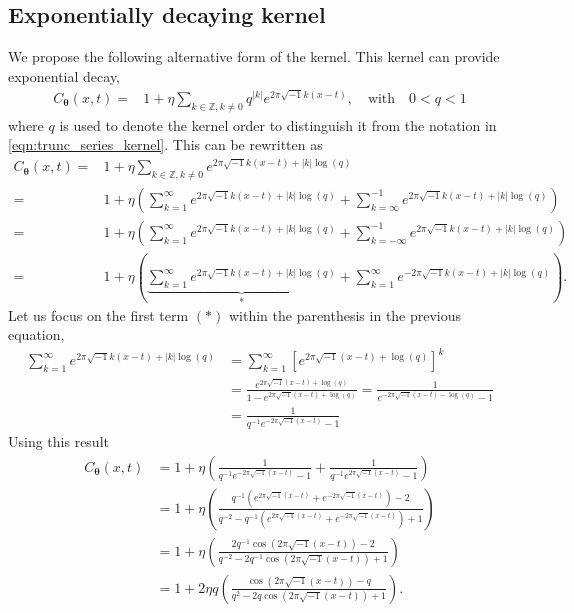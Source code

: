 \documentclass{svjour3}                     %
\newcommand{\bm}[1]{\boldsymbol{#1}}
\newcommand{\vtheta}{{\bm{\theta}}}
\def\abs#1{\ensuremath{\left \lvert #1 \right \rvert}}
\begin{document}
\subsection{Exponentially decaying kernel}
\label{sec:exp_decay_kernel}
We propose the following alternative form of the kernel. This kernel can provide exponential decay,
\begin{align*}
C_\vtheta(x, t) = & 1 + \eta \sum_{k \in \mathbb{Z}, k \neq 0 } q^{\abs{k}}  
e^{ 2 \pi\sqrt{-1} k (x-t)}, \quad \text{with} \quad 0 < q < 1
\end{align*}
where $q$ is used to denote the kernel order to distinguish it from the notation in \eqref{eqn:trunc_series_kernel}. This can be rewritten as
\begin{align*}
C_\vtheta(x, t) = & 1 + \eta \sum_{k \in \mathbb{Z}, k \neq 0 } 
e^{ 2 \pi\sqrt{-1} k (x-t) + \abs{k} \log(q)}
\\
=& 1 + \eta 
\left(
\sum_{k=1}^\infty e^{ 2 \pi\sqrt{-1} k (x-t) + \abs{k} \log(q)} 
+
\sum_{k=\infty}^{-1} e^{ 2 \pi\sqrt{-1} k (x-t) + \abs{k} \log(q)}
\right)
\\
=& 1 + \eta 
\left(
\sum_{k=1}^\infty e^{ 2 \pi\sqrt{-1} k (x-t) + \abs{k} \log(q)} 
+
\sum_{k=-\infty}^{-1} e^{ 2 \pi\sqrt{-1} k (x-t) + \abs{k} \log(q)}
\right)
\\
=& 1 + \eta 
\left(
\underbrace{
	\sum_{k=1}^\infty e^{ 2 \pi\sqrt{-1} k (x-t) + \abs{k} \log(q)} }_{*}
+
\sum_{k=1}^{\infty} e^{ -2 \pi\sqrt{-1} k (x-t) + \abs{k} \log(q)}
\right).
\end{align*}
Let us focus on the first term $(*)$ within the parenthesis in the previous equation,
\begin{align*}
\sum_{k=1}^\infty e^{ 2 \pi\sqrt{-1} k (x-t) + \abs{k} \log(q)} & =
\sum_{k=1}^\infty \left[e^{ 2 \pi\sqrt{-1} (x-t) +  \log(q)} \right]^k
\\
& = \frac{e^{ 2 \pi\sqrt{-1} (x-t) +  \log(q)}}{1- e^{ 2 \pi\sqrt{-1} (x-t) +  \log(q)}}
= \frac{1}{ e^{- 2 \pi\sqrt{-1} (x-t) -  \log(q)} -1 }
\\
& =\frac{1}{ q^{-1} e^{- 2 \pi\sqrt{-1} (x-t)} -1 }
\end{align*}
Using this result
\begin{align*}
C_\vtheta(x, t) &= 
1 + \eta 
\left(
\frac{1}{ q^{-1} e^{- 2 \pi\sqrt{-1} (x-t)} -1 }
+
\frac{1}{ q^{-1} e^{ 2 \pi\sqrt{-1} (x-t)} -1 }
\right)
\\
&= 
1 + \eta 
\left(
\frac{q^{-1} \left(e^{2 \pi\sqrt{-1} (x-t) }+ e^{ -2 \pi\sqrt{-1} (x-t)}\right) -2 }
{q^{-2} - q^{-1} \left(e^{ 2 \pi\sqrt{-1} (x-t)} + e^{ -2 \pi\sqrt{-1} (x-t)}\right) + 1 }
\right)
\\
&= 
1 + \eta 
\left(
\frac{2 q^{-1} \cos({2 \pi\sqrt{-1} (x-t) }) -2 }
{q^{-2} - 2 q^{-1} \cos({ 2 \pi\sqrt{-1} (x-t)})  + 1 }
\right)
\\
&= 
1 + 2 \eta q
\left(
\frac{ \cos({2 \pi\sqrt{-1} (x-t) }) - q }
{q^{2} - 2 q \cos({ 2 \pi\sqrt{-1} (x-t)})  + 1 }
\right).
\end{align*}
\end{document}

